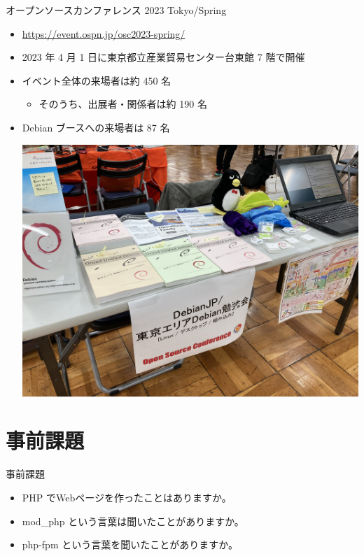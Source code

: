 \begin{frame}{オープンソースカンファレンス 2023 Tokyo/Spring}
\begin{itemize}
\item \url{https://event.ospn.jp/osc2023-spring/}  
\item 2023 年 4 月 1 日に東京都立産業貿易センター台東館 7 階で開催
\item イベント全体の来場者は約 450 名
  \begin{itemize}
  \item そのうち、出展者・関係者は約 190 名
  \end{itemize}
\item Debian ブースへの来場者は 87 名
\begin{center}
  \includegraphics[width=0.4\hsize]{image202304/osc2023spring-booth.jpg}
\end{center}
\end{itemize}
\end{frame}


\section{事前課題}


\begin{frame}{事前課題}
  \begin{itemize}
  \item PHP でWebページを作ったことはありますか。
  \item mod\_php という言葉は聞いたことがありますか。
  \item php-fpm という言葉を聞いたことがありますか。
  \end{itemize}
\end{frame}

{\footnotesize
 
}

%


